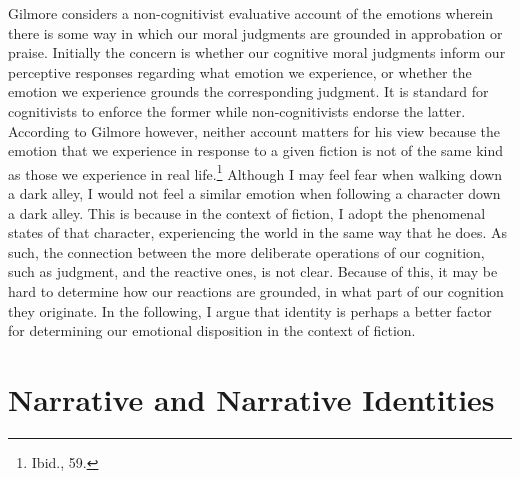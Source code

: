 \documentclass[
  12pt,
]{book}
\theoremstyle{definition}
\theoremstyle{definition}
\theoremstyle{definition}
\theoremstyle{definition}
\theoremstyle{remark}
\begin{document}
Gilmore considers a non-cognitivist evaluative account of the emotions wherein there is some way in which our moral judgments are grounded in approbation or praise. Initially the concern is whether our cognitive moral judgments inform our perceptive responses regarding what emotion we experience, or whether the emotion we experience grounds the corresponding judgment. It is standard for cognitivists to enforce the former while non-cognitivists endorse the latter. According to Gilmore however, neither account matters for his view because the emotion that we experience in response to a given fiction is not of the same kind as those we experience in real life.\footnote{Ibid., 59.} Although I may feel fear when walking down a dark alley, I would not feel a similar emotion when following a character down a dark alley. This is because in the context of fiction, I adopt the phenomenal states of that character, experiencing the world in the same way that he does. As such, the connection between the more deliberate operations of our cognition, such as judgment, and the reactive ones, is not clear. Because of this, it may be hard to determine how our reactions are grounded, in what part of our cognition they originate. In the following, I argue that identity is perhaps a better factor for determining our emotional disposition in the context of fiction.

\section{Narrative and Narrative Identities}\label{narrative-and-narrative-identities}
\end{document}
